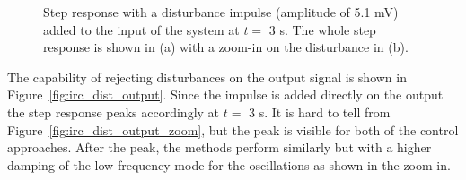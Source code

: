 \begin{figure}[h!]
  \centering %
  \qquad
  \caption{\label{fig:irc_dist_input} Step response with a disturbance impulse (amplitude of 5.1 mV) added to the input of the system at $t=$ 3 s. The whole step response is shown in (a) with a zoom-in on the disturbance in (b).}
\end{figure}

The capability of rejecting disturbances on the output signal is shown in Figure~\ref{fig:irc_dist_output}. Since the impulse is added directly on the output the step response peaks accordingly at $t=$ 3 s. It is hard to tell from Figure~\ref{fig:irc_dist_output_zoom}, but the peak is visible for both of the control approaches. After the peak, the methods perform similarly but with a higher damping of the low frequency mode for the \abbrIRC oscillations as shown in the zoom-in.

